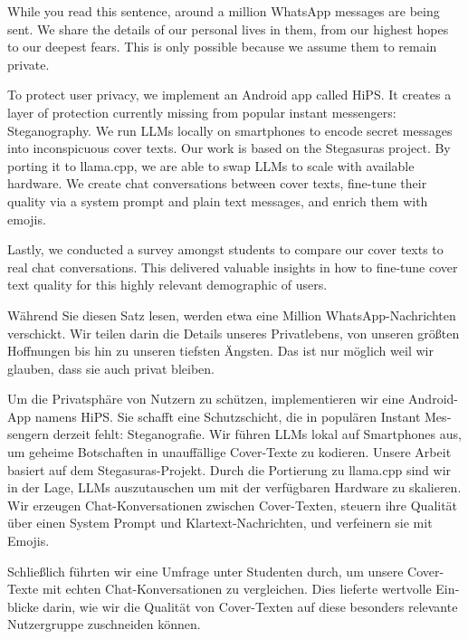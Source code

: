 
\begingroup
\let\clearpage\relax
\let\cleardoublepage\relax
\let\cleardoublepage\relax

While you read this sentence, around a million WhatsApp messages are being sent. We share the details of our personal lives in them, from our highest hopes to our deepest fears. This is only possible because we assume them to remain private.

To protect user privacy, we implement an Android app called \gls{HiPS}. It creates a layer of protection currently missing from popular instant messengers: Steganography. We run \glspl{LLM} locally on smartphones to encode secret messages into inconspicuous cover texts. Our work is based on the Stegasuras project. By porting it to llama.cpp, we are able to swap \glspl{LLM} to scale with available hardware. We create chat conversations between cover texts, fine-tune their quality via a system prompt and plain text messages, and enrich them with emojis.

Lastly, we conducted a survey amongst students to compare our cover texts to real chat conversations. This delivered valuable insights in how to fine-tune cover text quality for this highly relevant demographic of users.

\vfill

\begin{otherlanguage}{ngerman}
Während Sie diesen Satz lesen, werden etwa eine Million WhatsApp-Nachrichten verschickt. Wir teilen darin die Details unseres Privatlebens, von unseren größten Hoffnungen bis hin zu unseren tiefsten Ängsten. Das ist nur möglich weil wir glauben, dass sie auch privat bleiben.

Um die Privatsphäre von Nutzern zu schützen, implementieren wir eine Android-App namens \gls{HiPS}. Sie schafft eine Schutzschicht, die in populären Instant Messengern derzeit fehlt: Steganografie. Wir führen \glspl{LLM} lokal auf Smartphones aus, um geheime Botschaften in unauffällige Cover-Texte zu kodieren. Unsere Arbeit basiert auf dem Stegasuras-Projekt. Durch die Portierung zu llama.cpp sind wir in der Lage, \glspl{LLM} auszutauschen um mit der verfügbaren Hardware zu skalieren. Wir erzeugen Chat-Konversationen zwischen Cover-Texten, steuern ihre Qualität über einen System Prompt und Klartext-Nachrichten, und verfeinern sie mit Emojis.

Schließlich führten wir eine Umfrage unter Studenten durch, um unsere Cover-Texte mit echten Chat-Konversationen zu vergleichen. Dies lieferte wertvolle Einblicke darin, wie wir die Qualität von Cover-Texten auf diese besonders relevante Nutzergruppe zuschneiden können.
\end{otherlanguage}

\endgroup

\vfill
